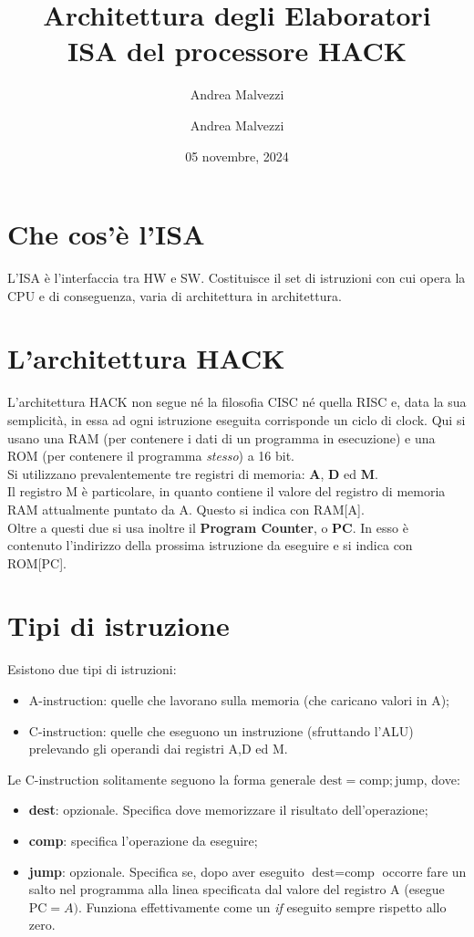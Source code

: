 \documentclass[12pt]{article}
\author{Andrea Malvezzi}
\title{\textbf{Architettura degli Elaboratori\\ ISA del processore HACK}}
\date{05 novembre, 2024}
\author{Andrea Malvezzi}
\begin{document}
\maketitle
\pagebreak
\tableofcontents
\pagebreak

\section{Che cos'è l'ISA}
L'ISA è l'interfaccia tra HW e SW.
Costituisce il set di istruzioni con cui opera la CPU e di conseguenza, varia di architettura in architettura.

\section{L'architettura HACK}
L'architettura HACK non segue né la filosofia CISC né quella RISC e, data la sua semplicità, in essa ad ogni istruzione eseguita corrisponde un ciclo di clock.
Qui si usano una RAM (per contenere i dati di un programma in esecuzione) e una ROM (per contenere il programma \textit{stesso}) a 16 bit. \\
Si utilizzano prevalentemente tre registri di memoria: \textbf{A}, \textbf{D} ed \textbf{M}.
\\Il registro M è particolare, in quanto contiene il valore del registro di memoria RAM attualmente puntato da A. Questo si indica con RAM[A]. \\
Oltre a questi due si usa inoltre il \textbf{Program Counter}, o \textbf{PC}. In esso è contenuto l'indirizzo della prossima istruzione da eseguire e si indica con ROM[PC].

\section{Tipi di istruzione}
Esistono due tipi di istruzioni:
\begin{itemize}
    \item A-instruction: quelle che lavorano sulla memoria (che caricano valori in A);
    \item C-instruction: quelle che eseguono un instruzione (sfruttando l'ALU) prelevando gli operandi dai registri A,D ed M.
\end{itemize}
Le C-instruction solitamente seguono la forma generale $\text{dest} = \text{comp}; \text{jump}$, dove:
\begin{itemize}
    \item \textbf{dest}: opzionale. Specifica dove memorizzare il risultato dell'operazione;
    \item \textbf{comp}: specifica l'operazione da eseguire;
    \item \textbf{jump}: opzionale. Specifica se, dopo aver eseguito $\text{dest} = \text{comp}$ occorre fare un salto nel programma alla linea specificata dal valore del registro A (esegue $\text{PC} = A)$. Funziona effettivamente come un \textit{if} eseguito sempre rispetto allo zero. 
\end{itemize}
\end{document}
